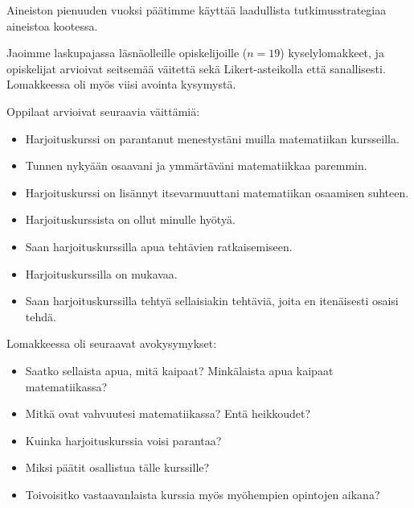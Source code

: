 Aineiston pienuuden vuoksi päätimme käyttää laadullista tutkimusstrategiaa aineistoa kootessa.

Jaoimme laskupajassa läsnäolleille opiskelijoille ($n=19$) kyselylomakkeet, ja opiskelijat arvioivat seitsemää väitettä sekä Likert-asteikolla että sanallisesti.
Lomakkeessa oli myös viisi avointa kysymystä.

Oppilaat arvioivat seuraavia väittämiä:
\begin{itemize}
\item Harjoituskurssi on parantanut menestystäni muilla matematiikan kursseilla.
\item Tunnen nykyään osaavani ja ymmärtäväni matematiikkaa paremmin.
\item Harjoituskurssi on lisännyt itsevarmuuttani matematiikan osaamisen suhteen.
\item Harjoituskurssista on ollut minulle hyötyä.
\item Saan harjoituskurssilla apua tehtävien ratkaisemiseen.
\item Harjoituskurssilla on mukavaa.
\item Saan harjoituskurssilla tehtyä sellaisiakin tehtäviä, joita en itenäisesti osaisi tehdä.
\end{itemize}
Lomakkeessa oli seuraavat avokysymykset:
\begin{itemize}
\item Saatko sellaista apua, mitä kaipaat? Minkälaista apua kaipaat matematiikassa?
\item Mitkä ovat vahvuutesi matematiikassa? Entä heikkoudet?
\item Kuinka harjoituskurssia voisi parantaa?
\item Miksi päätit osallistua tälle kurssille?
\item Toivoisitko vastaavanlaista kurssia myös myöhempien opintojen aikana?
\end{itemize}
\begin{comment}
Haastattelimme myös harjoituskurssin opettajaa.
\textbf{Tämä pitäisi vielä tehdä..}
\begin{itemize}
\item Miten autat oppilasta löytämään ratkaisun?
\item Millainen on tyypillinen laskupajan asiakas?
\item Onko laskupaja yleensä ollut suosittu?
\item Minkälaisille opiskelijoille laskupaja on suunnattu?
\item Kuinka hyödylliseksi koet laskupajan?
\end{itemize}
\end{comment}

